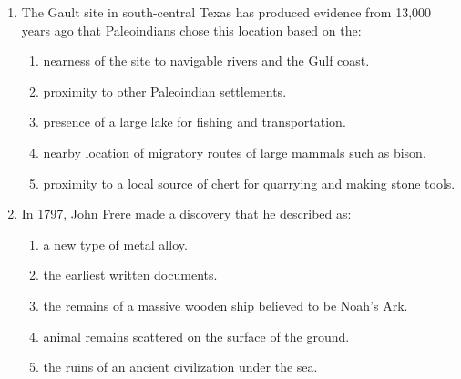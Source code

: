 \documentclass[12pt]{article}
\begin{document}
\begin{enumerate}[label=\arabic*.]
\begin{enumerate}[label=(\alph*)]
\end{enumerate}
\item The Gault site in south-central Texas has produced evidence from 13,000 years ago that Paleoindians chose this location based on the:
\begin{enumerate}[label=(\alph*)]
    \item nearness of the site to navigable rivers and the Gulf coast.
    \item proximity to other Paleoindian settlements.
    \item presence of a large lake for fishing and transportation.
    \item nearby location of migratory routes of large mammals such as bison.
    \item proximity to a local source of chert for quarrying and making stone tools.
\end{enumerate}
\item In 1797, John Frere made a discovery that he described as:
\begin{enumerate}[label=(\alph*)]
    \item a new type of metal alloy.
    \item the earliest written documents.
    \item the remains of a massive wooden ship believed to be Noah's Ark.
    \item animal remains scattered on the surface of the ground.
    \item the ruins of an ancient civilization under the sea.
\end{enumerate}
\end{enumerate}
\end{document}
